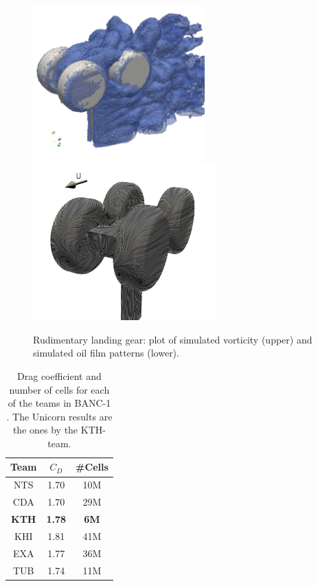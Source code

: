 \begin{figure}
\centering
\includegraphics[height=6cm]{unfinished/hoffman-1/png/rlg_vorticity}
\includegraphics[height=6cm]{unfinished/hoffman-1/png/oilfilm_back_sim}
\caption{Rudimentary landing gear: plot of simulated vorticity (upper) and simulated oil film patterns (lower).}
\label{rlg}
\end{figure}

\begin{table}[hbt]
\begin{center}
\begin{tabular}{|c|cc|}
\hline
Team & $C_D$ & \#Cells \\
\hline
NTS &    1.70 &    10M \\
CDA  &   1.70  &   29M \\
\textbf{KTH}  &   \textbf{1.78}  &   \textbf{6M}\\
KHI  &   1.81  &   41M \\
EXA  &   1.77  &   36M \\
TUB  &   1.74  &   11M \\
\hline
\end{tabular}
\caption{\label{tab:hoffman-1-rlg} Drag coefficient and number of cells for each of the teams in BANC-1 \cite{SpalartMejia2011}. The Unicorn results are the ones by the KTH-team.}
\end{center}
\end{table}

